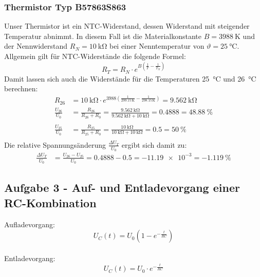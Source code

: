 \subsubsection{Thermistor Typ B57863S863}
Unser Thermistor ist ein NTC-Widerstand, dessen Widerstand mit steigender Temperatur abnimmt.
In diesem Fall ist die Materialkonstante $B = \SI{3988}{\kelvin}$ und der Nennwiderstand $R_N = \SI{10}{\kilo\ohm}$ bei einer Nenntemperatur von $\vartheta = \SI{25}{\degreeCelsius}$. \\
Allgemein gilt für NTC-Widerstände die folgende Formel:
\begin{equation}
    R_T = R_N \cdot e^{B \left( \frac{1}{T} - \frac{1}{T_N} \right)}
\end{equation}
Damit lassen sich auch die Widerstände für die Temperaturen \SI{25}{\degreeCelsius} und \SI{26}{\degreeCelsius} berechnen:
\begin{align*}
    R_{26}             & = \SI{10}{\kilo\ohm} \cdot e^{3988 \left( \frac{1}{299.15 \, \mathrm{K}} - \frac{1}{298.15 \, \mathrm{K}} \right)} = \SI{9.562}{\kilo\ohm}
    \\
    \frac{U_{26}}{U_0} & = \frac{R_{26}}{R_{26} + R_0} = \frac{\SI{9.562}{\kilo\ohm}}{\SI{9.562}{\kilo\ohm} + \SI{10}{\kilo\ohm}} = \num{0.4888} = \SI{48.88}{\percent} \\
    \\
    \frac{U_{25}}{U_0} & = \frac{R_{25}}{R_{25} + R_0} = \frac{\SI{10}{\kilo\ohm}}{\SI{10}{\kilo\ohm} + \SI{10}{\kilo\ohm}} = \num{0.5} = \SI{50}{\percent}             \\
\end{align*}
Die relative Spannungsänderung $\frac{\Delta U_T}{U_0}$ ergibt sich damit zu:
\begin{align*}
    \frac{\Delta U_T}{U_0} & = \frac{U_{26} - U_{25}}{U_0} = \num{0.4888} - \num{0.5} = -\num{11.19e-3} = -\SI{1.119}{\percent}
\end{align*}

\subsection{Aufgabe 3 - Auf- und Entladevorgang einer RC-Kombination}
Aufladevorgang:
\begin{equation}
    U_C(t) = U_0 \left( 1 - e^{-\frac{t}{RC}} \right)
\end{equation}
\\
Entladevorgang:
\begin{equation}
    U_C(t) = U_0 \cdot e^{-\frac{t}{RC}}
\end{equation}

